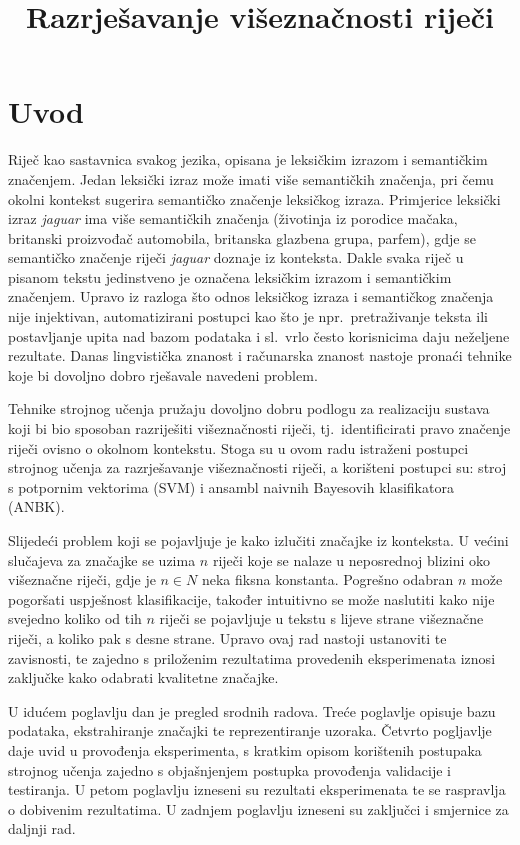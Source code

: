\documentclass[10pt, a4paper]{article}
\title{Razrješavanje višeznačnosti riječi}
\begin{document}
\maketitleabstract

\section{Uvod}

Riječ kao sastavnica svakog jezika, opisana je leksičkim izrazom i semantičkim značenjem.
Jedan leksički izraz može imati više semantičkih značenja, pri čemu okolni kontekst
sugerira semantičko značenje leksičkog izraza. 
Primjerice leksički izraz \emph{jaguar} ima više semantičkih značenja
(životinja iz porodice mačaka, britanski proizvođač automobila, 
britanska glazbena grupa, parfem), gdje se semantičko značenje riječi \emph{jaguar}
doznaje iz konteksta. Dakle svaka riječ u pisanom tekstu jedinstveno je označena 
leksičkim izrazom i semantičkim značenjem. Upravo iz razloga što odnos 
leksičkog izraza i semantičkog značenja nije injektivan, 
automatizirani postupci kao što je npr.~pretraživanje teksta ili
postavljanje upita nad bazom podataka i sl.~vrlo često korisnicima 
daju neželjene rezultate. Danas lingvistička znanost i računarska znanost 
nastoje pronaći tehnike koje bi dovoljno dobro 
rješavale navedeni problem.

Tehnike strojnog učenja pružaju dovoljno dobru podlogu za realizaciju sustava
koji bi bio sposoban razriješiti višeznačnosti riječi, tj.~identificirati pravo
značenje riječi ovisno o okolnom kontekstu. Stoga su u ovom radu istraženi postupci
strojnog učenja za razrješavanje višeznačnosti riječi, a korišteni postupci su:
stroj s potpornim vektorima (SVM) i ansambl naivnih Bayesovih klasifikatora (ANBK).

Slijedeći problem koji se pojavljuje je kako izlučiti značajke iz konteksta.
U većini slučajeva za značajke se uzima $n$ riječi koje se nalaze u neposrednoj blizini oko višeznačne riječi, gdje je $n \in N$ neka fiksna konstanta. Pogrešno odabran $n$ može pogoršati uspješnost klasifikacije, također intuitivno se može naslutiti kako nije svejedno koliko od tih $n$ riječi se pojavljuje u tekstu s lijeve strane višeznačne riječi, a koliko pak s desne strane.
Upravo ovaj rad nastoji ustanoviti te zavisnosti, te zajedno s priloženim rezultatima provedenih eksperimenata iznosi zaključke kako odabrati kvalitetne značajke.

U idućem poglavlju dan je pregled srodnih radova. Treće poglavlje opisuje bazu
podataka, ekstrahiranje značajki te reprezentiranje uzoraka. Četvrto pogljavlje
daje uvid u provođenja eksperimenta, s kratkim opisom korištenih postupaka
strojnog učenja zajedno s objašnjenjem postupka provođenja validacije i testiranja. U petom
poglavlju izneseni su rezultati eksperimenata te se raspravlja o dobivenim rezultatima.
U zadnjem poglavlju izneseni su zaključci i smjernice za daljnji rad.
\end{document}
